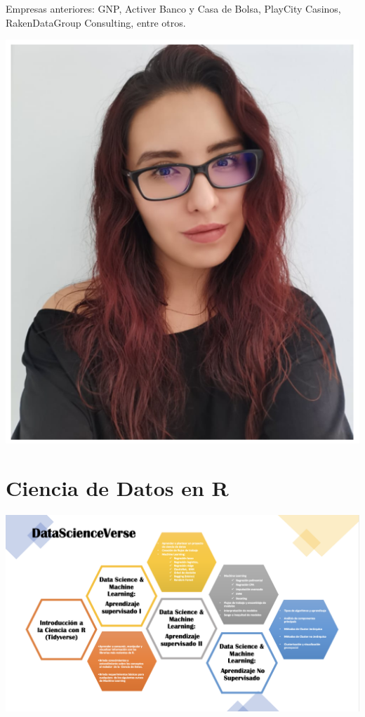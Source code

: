 \documentclass[
]{book}
\begin{document}
Empresas anteriores: GNP, Activer Banco y Casa de Bolsa, PlayCity Casinos,
RakenDataGroup Consulting, entre otros.

\begin{center}\includegraphics[width=600pt]{img/00-presentacion/lizzy} \end{center}

\hypertarget{ciencia-de-datos-en-r}{%
\section{Ciencia de Datos en R}\label{ciencia-de-datos-en-r}}

\begin{center}\includegraphics[width=600pt]{img/00-presentacion/DataScienceVerse} \end{center}
\end{document}
